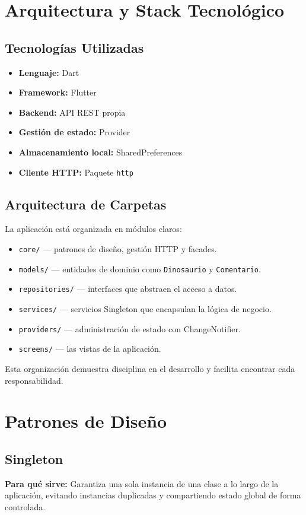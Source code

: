 \documentclass[12pt,a4paper]{article}
\begin{document}
\section{Arquitectura y Stack Tecnológico}

\subsection{Tecnologías Utilizadas}
\begin{itemize}
    \item \textbf{Lenguaje:} Dart
    \item \textbf{Framework:} Flutter
    \item \textbf{Backend:} API REST propia
    \item \textbf{Gestión de estado:} Provider
    \item \textbf{Almacenamiento local:} SharedPreferences
    \item \textbf{Cliente HTTP:} Paquete \texttt{http}
\end{itemize}

\subsection{Arquitectura de Carpetas}
La aplicación está organizada en módulos claros:
\begin{itemize}
    \item \texttt{core/} — patrones de diseño, gestión HTTP y facades.
    \item \texttt{models/} — entidades de dominio como \texttt{Dinosaurio} y \texttt{Comentario}.
    \item \texttt{repositories/} — interfaces que abstraen el acceso a datos.
    \item \texttt{services/} — servicios Singleton que encapsulan la lógica de negocio.
    \item \texttt{providers/} — administración de estado con ChangeNotifier.
    \item \texttt{screens/} — las vistas de la aplicación.
\end{itemize}
Esta organización demuestra disciplina en el desarrollo y facilita encontrar cada responsabilidad.

\section{Patrones de Diseño}

\subsection{Singleton}
\textbf{Para qué sirve:} Garantiza una sola instancia de una clase a lo largo de la aplicación, evitando instancias duplicadas y compartiendo estado global de forma controlada.
\end{document}
